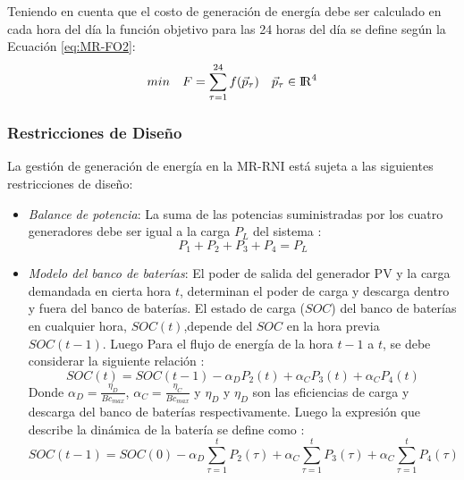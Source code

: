 Teniendo en cuenta que el costo de generación de energía debe ser calculado en cada hora del día la función objetivo para las 24 horas del día se define según la Ecuación \ref{eq:MR-FO2}:
\begin{equation}\label{eq:MR-FO2}
 min\quad  F=
 \sum_{\tau=1}^{24}f(\vec{p}_\tau) \quad \vec{p}_\tau \in {\rm I\!R}^{4}
 \end{equation}
\subsubsection{Restricciones de Diseño}
La gestión de generación de energía en la MR-RNI está sujeta a las siguientes restricciones de diseño:
\begin{itemize}
\item \textit{Balance de potencia}: La suma de las potencias suministradas por los cuatro generadores debe ser igual a la carga $P_L$ del sistema :
 \begin{equation}
P_1+P_2+P_3+P_4=P_L
 \end{equation}
 \item \textit{Modelo del banco de baterías}: El poder de salida del generador PV y la carga demandada en cierta hora $t$, determinan el poder de carga y descarga dentro y fuera del banco de baterías.
El estado de carga ($SOC$) del banco de baterías en cualquier hora, $SOC(t)$,depende del $SOC$ en la hora previa $SOC(t-1)$. Luego Para el  flujo de energía de la hora $t-1$ a $t$, se debe considerar la siguiente relación \cite{tazvinga2013minimum}:
 \begin{equation}
SOC(t)=SOC(t-1)- \alpha_DP_2(t)+\alpha_CP_3(t)+\alpha_CP_4(t)
 \end{equation}
 Donde $\alpha_D=\frac{\eta_D}{Bc_{max}}$, $\alpha_C=\frac{\eta_C}{Bc_{max}}$ y $\eta_D$ y $\eta_D$ son las eficiencias de carga y descarga del banco de baterías respectivamente. Luego la expresión que describe la dinámica de la batería se define como \cite{tazvinga2013minimum}:
  \begin{equation}
SOC(t-1)=SOC(0)- \alpha_D \sum_{\tau=1}^{t}P_2(\tau)+\alpha_C\sum_{\tau=1}^{t}P_3(\tau)+\alpha_C \sum_{\tau=1}^{t}P_4(\tau)
 \end{equation}
 

\end{itemize}
